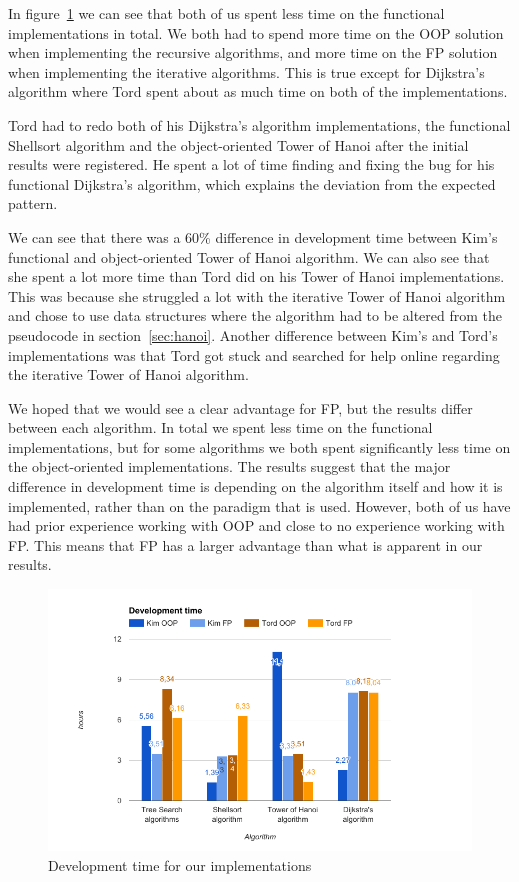 \documentclass {article}
\begin{document}
In figure~\ref{fig:development-time-graph} we can see that both of us spent less time on the functional implementations in total. We both had to spend more time on the OOP solution when implementing the recursive algorithms, and more time on the FP solution when implementing the iterative algorithms. This is true except for Dijkstra's algorithm where Tord spent about as much time on both of the implementations. 
 
Tord had to redo both of his Dijkstra's algorithm implementations, the functional Shellsort algorithm and the object-oriented Tower of Hanoi after the initial results were registered. He spent a lot of time finding and fixing the bug for his functional Dijkstra's algorithm, which explains the deviation from the expected pattern.
 
We can see that there was a 60\% difference in development time between Kim's functional and object-oriented Tower of Hanoi algorithm. We can also see that she spent a lot more time than Tord did on his Tower of Hanoi implementations. This was because she struggled a lot with the iterative Tower of Hanoi algorithm and chose to use data structures where the algorithm had to be altered from the pseudocode in section~\ref{sec:hanoi}. Another difference between Kim's and Tord's implementations was that Tord got stuck and searched for help online regarding the iterative Tower of Hanoi algorithm.
 
We hoped that we would see a clear advantage for FP, but the results differ between each algorithm. In total we spent less time on the functional implementations, but for some algorithms we both spent significantly less time on the object-oriented implementations. The results suggest that the major difference in development time is depending on the algorithm itself and how it is implemented, rather than on the paradigm that is used. However, both of us have had prior experience working with OOP and close to no experience working with FP. This means that FP has a larger advantage than what is apparent in our results. 
 
\begin{figure}[H]
\centering
\includegraphics[width=\textwidth]{development-time-graph}

\caption{Development time for our implementations}
\label{fig:development-time-graph}
\end{figure}
\end{document}
